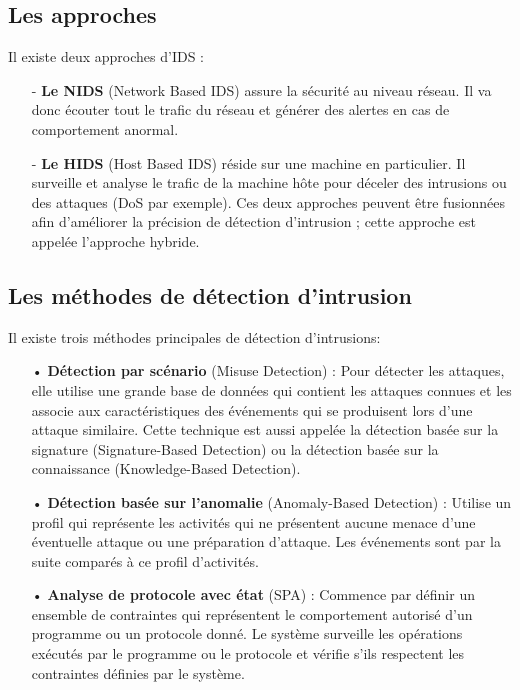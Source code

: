 \subsection{Les approches}
\label{approchesIDS}
Il existe deux approches d’IDS :\\
\begin{itemize}
\item[-]\textbf{Le NIDS} (Network Based IDS) assure la sécurité au niveau réseau. Il va donc écouter tout le trafic du réseau et générer des alertes en cas de comportement anormal.\\
\item[-]\textbf{Le HIDS} (Host Based IDS) réside sur une machine en particulier. Il surveille et analyse le trafic de la machine hôte pour déceler des intrusions ou des attaques (DoS par exemple). 
Ces deux approches peuvent être fusionnées afin d’améliorer la précision de détection d’intrusion ; cette approche est appelée l’approche hybride.
\end{itemize}

\subsection{Les méthodes de détection d’intrusion} 
Il existe trois méthodes principales de détection d’intrusions:\\
\begin{itemize}
\item[•]\textbf{Détection par scénario} (Misuse Detection) : Pour détecter les attaques, elle utilise une grande base de données qui contient les attaques connues et les associe aux caractéristiques des événements qui se produisent lors d’une attaque similaire. Cette technique est aussi appelée la détection basée sur la signature (Signature-Based Detection) ou la détection basée sur la connaissance (Knowledge-Based Detection).\\
\item[•]\textbf{Détection basée sur l’anomalie} (Anomaly-Based Detection) : Utilise un profil qui représente les activités qui ne présentent aucune menace d’une éventuelle attaque ou une préparation d’attaque. Les événements sont par la suite comparés à ce profil d’activités.\\
\item[•]\textbf{Analyse de protocole avec état} (SPA) : Commence par définir un ensemble de contraintes qui représentent le comportement autorisé d’un programme ou un protocole donné. Le système surveille les opérations exécutés par le programme ou le protocole et vérifie s’ils respectent les contraintes définies par le système. 
\end{itemize} 

